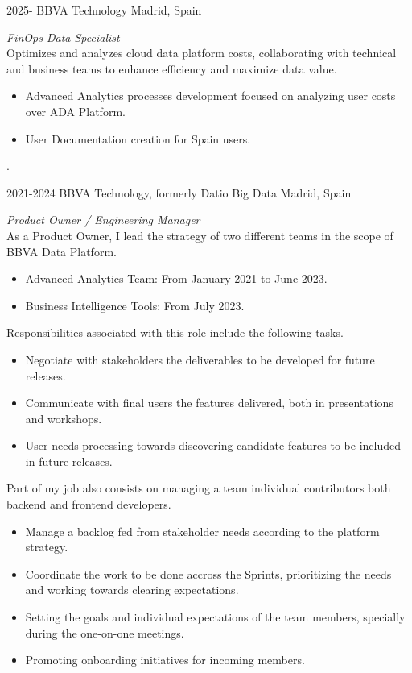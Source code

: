 \documentclass[]{friggeri-cv}
\begin{document}
\begin{entrylist}
\entry
{2025-}
{BBVA Technology}
{Madrid, Spain}
{\emph{FinOps Data Specialist} \\
Optimizes and analyzes cloud data platform costs, collaborating with technical and business teams to enhance efficiency and maximize data value.
\begin{itemize}
  \item Advanced Analytics processes development focused on analyzing user costs over ADA Platform.
  \item User Documentation creation for Spain users.
\end{itemize}.}
\entry
{2021-2024}
{BBVA Technology, formerly Datio Big Data}
{Madrid, Spain}
{\emph{Product Owner / Engineering Manager} \\
As a Product Owner, I lead the strategy of two different teams in the scope of BBVA Data Platform.
\begin{itemize}
  \item Advanced Analytics Team: From January 2021 to June 2023.
  \item Business Intelligence Tools: From July 2023.
\end{itemize}
Responsibilities associated with this role include the following tasks.
\begin{itemize}
  \item Negotiate with stakeholders the deliverables to be developed for future releases.
  \item Communicate with final users the features delivered, both in presentations and workshops.
  \item User needs processing towards discovering candidate features to be included in future releases.
\end{itemize}
Part of my job also consists on managing a team individual contributors both backend and frontend developers.
\begin{itemize}
  \item Manage a backlog fed from stakeholder needs according to the platform strategy.
  \item Coordinate the work to be done accross the Sprints, prioritizing the needs and working towards clearing expectations.
  \item Setting the goals and individual expectations of the team members, specially during the one-on-one meetings.
  \item Promoting onboarding initiatives for incoming members.

\end{itemize}}
\end{entrylist}
\end{document}
